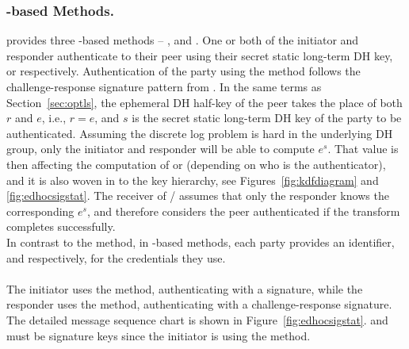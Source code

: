 \subsubsection{\mStat-based Methods.}
\mEdhoc{} provides three \mStat-based methods -- \mSigStat{}, \mStatStat{} and
\mStatSig{}.
%
One or both of the initiator and responder authenticate to their peer using
their secret static long-term DH key, \mLtki{} or \mLtkr{} respectively.
%
Authentication of the party using the \mStat{} method follows the
challenge-response signature pattern from \mOptls.
%
In the same terms as Section~\ref{sec:optls}, the ephemeral DH half-key of the
peer takes the place of both $r$ and $e$, i.e., $r=e$, and $s$ is the secret
static long-term DH key of the party to be authenticated.
%
Assuming the discrete log problem is hard in the underlying DH group,
only the initiator and responder will be able to compute $e^s$.
%
That value is then affecting the computation of \mAuthr{} or \mAuthi{}
(depending on who is the authenticator), and it is also
woven in to the key hierarchy, see
Figures~\ref{fig:kdfdiagram} and \ref{fig:edhocsigstat}.
%
The receiver of \mAuthi{}/\mAuthr{} assumes that only the responder knows
the corresponding $e^s$, and therefore considers the peer authenticated if
the \mAead{} transform completes successfully.\\
%
In contrast to the \mPskPsk{} method, in \mStat{}-based methods, each party provides an identifier, \mIdcredi{} and \mIdcredr{} respectively, for the credentials they use.
%

\paragraph{\mSigStat}
The initiator uses the \mSig{} method, authenticating with a signature,
while the responder uses the \mStat{} method, authenticating with a
challenge-response signature.
%
The detailed message sequence chart is shown in Figure~\ref{fig:edhocsigstat}.
%
\mCredi{} and \mLtki{} must be signature keys since the initiator is using the
\mSig{} method.
%


